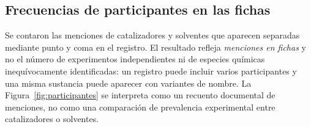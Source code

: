

\subsection{Frecuencias de participantes en las fichas}
Se contaron las menciones de catalizadores y solventes que aparecen separadas mediante punto y coma en el registro. El resultado refleja \emph{menciones en fichas} y no el número de experimentos independientes ni de especies químicas inequívocamente identificadas: un registro puede incluir varios participantes y una misma sustancia puede aparecer con variantes de nombre. La Figura~\ref{fig:participantes} se interpreta como un recuento documental de menciones, no como una comparación de prevalencia experimental entre catalizadores o solventes.
